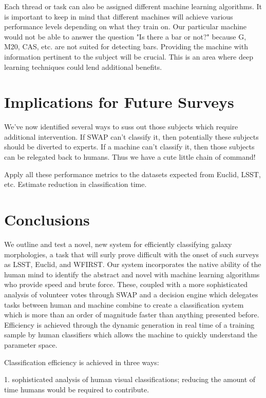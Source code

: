 \documentclass[twocolumn]{aastex6}
\begin{document}
Each thread or task can also be assigned different machine learning algorithms. 
It is important to keep in mind that different machines will achieve various 
performance levels depending on what they train on. Our particular machine would
not be able to answer the question "Is there a bar or not?" because G, M20, CAS, etc.
are not suited for detecting bars. Providing the machine with information 
pertinent to the subject will be crucial. This is an area where deep learning 
techniques could lend additional benefits. 


\section{Implications for Future Surveys}

We've now identified several ways to suss out those subjects which require 
additional intervention. If SWAP can't classify it, then potentially these subjects 
should be diverted to experts. If a machine can't classify it, then those subjects
can be relegated back to humans. Thus we have a cute little chain of command!

Apply all these performance metrics to the datasets expected from Euclid, LSST, etc. Estimate reduction in classification time. 

\section{Conclusions}

We outline and test a novel, new system for efficiently classifying galaxy morphologies, 
a task that will surly prove difficult with the onset of such surveys as LSST, Euclid, 
and WFIRST. Our system incorporates the native ability of the human mind to identify
the abstract and novel with machine learning algorithms who provide speed and 
brute force. These, coupled with a more sophisticated analysis of volunteer votes 
through SWAP and a decision engine which delegates tasks between human and 
machine combine to create a classification system which is more than an order of
magnitude faster than anything presented before. Efficiency is achieved through 
the dynamic generation in real time of a training sample by human classifiers which
allows the machine to quickly understand the parameter space. 

Classification efficiency is achieved in three ways: 

1. sophisticated analysis of human visual classifications; reducing the amount of time
humans would be required to contribute. 
\end{document}
